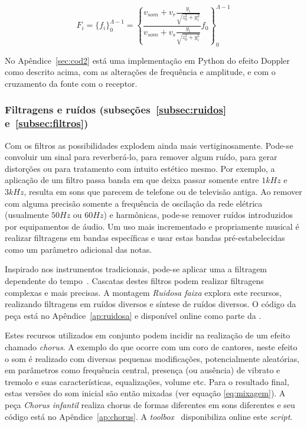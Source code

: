 \begin{equation}\label{eq:ffDoppler}
    F_i=\{f_i\}_0^{\Lambda-1}=\left\{\frac{v_{som} + v_r\frac{y_i}{\sqrt{z_0^2+y_i^2}}}{v_{som}+v_s\frac{y_i}{\sqrt{z_0^2+y_i^2}}}f_0\right\}_0^{\Lambda-1}
\end{equation}

No Apêndice~\ref{sec:cod2} está uma implementação em Python do efeito Doppler como descrito acima, com as alterações de frequência e amplitude, e com o cruzamento da fonte com o receptor.

\subsubsection{Filtragens e ruídos (subseções~\ref{subsec:ruidos} e~\ref{subsec:filtros})}
Com os filtros as possibilidades explodem ainda mais vertiginosamente. Pode-se convoluir um sinal para reverberá-lo, para
remover algum ruído, para gerar distorções ou para tratamento com intuito estético mesmo. Por exemplo,
a aplicação de um filtro passa banda em que deixa passar somente entre $1kHz$ e $3kHz$, resulta em sons
que parecem de telefone ou de televisão antiga. Ao remover com alguma precisão somente
a frequência de oscilação da rede elétrica (usualmente $50Hz$ ou $60Hz$) e harmônicas, pode-se remover
ruídos introduzidos por equipamentos de áudio.
Um uso mais incrementado
e propriamente musical é realizar filtragens em bandas específicas e usar estas bandas
pré-estabelecidas como um parâmetro adicional das notas.

Inspirado nos instrumentos tradicionais, pode-se aplicar uma a filtragem dependente do tempo~\cite{Roederer}.
Cascatas
destes filtros podem realizar filtragens complexas e mais precisas. A montagem \emph{Ruidosa faixa} explora
este recursos, realizando filtragens em ruídos diversos e síntese de ruídos diversos. O código da peça está no Apêndice~\ref{ap:ruidosa} e disponível online como parte da \massa.

Estes recursos utilizados em conjunto podem incidir na realização de um efeito chamado \emph{chorus}. A
exemplo do que ocorre com um coro de cantores, neste efeito o som é realizado com diversas pequenas modificações,
potencialmente aleatórias, em parâmetros como frequência central, presença (ou ausência) de vibrato
e tremolo e suas características, equalizações, volume etc. Para o resultado final, estas versões do som
inicial são então mixadas (ver equação \ref{eq:mixagem}). A peça \emph{Chorus infantil} realiza chorus de formas
diferentes em sons diferentes e seu código está no Apêndice~\ref{ap:chorus}. A \emph{toolbox} \massa\ disponibiliza online este \emph{script}.

